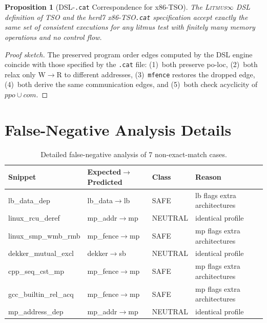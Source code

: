 \documentclass[11pt]{article}
\newcommand{\litmus}{\textsc{Litmus$\infty$}}
\newtheorem{proposition}[theorem]{Proposition}
\begin{document}
\begin{proposition}[DSL-\texttt{.cat} Correspondence for x86-TSO]
\label{prop:dsl-cat}
The \litmus{} DSL definition of TSO and the herd7 x86-TSO\texttt{.cat}
specification accept exactly the same set of consistent executions for
any litmus test with finitely many memory operations and no control flow.
\end{proposition}

\begin{proof}[Proof sketch]
The preserved program order edges computed by the DSL engine coincide
with those specified by the \texttt{.cat} file: (1)~both preserve po-loc,
(2)~both relax only W$\to$R to different addresses,
(3)~\texttt{mfence} restores the dropped edge,
(4)~both derive the same communication edges, and
(5)~both check acyclicity of $\mathit{ppo} \cup \mathit{com}$.
\end{proof}

\section{False-Negative Analysis Details}
\label{app:false-neg-details}

\begin{longtable}{lllp{5cm}}
\caption{Detailed false-negative analysis of 7 non-exact-match cases.} \\
\toprule
\textbf{Snippet} & \textbf{Expected$\to$Predicted} & \textbf{Class} & \textbf{Reason} \\
\midrule
\endfirsthead
\endhead
\bottomrule
\endfoot
lb\_data\_dep & lb\_data$\to$lb & SAFE & lb flags extra architectures \\
linux\_rcu\_deref & mp\_addr$\to$mp & NEUTRAL & identical profile \\
linux\_smp\_wmb\_rmb & mp\_fence$\to$mp & SAFE & mp flags extra architectures \\
dekker\_mutual\_excl & dekker$\to$sb & NEUTRAL & identical profile \\
cpp\_seq\_cst\_mp & mp\_fence$\to$mp & SAFE & mp flags extra architectures \\
gcc\_builtin\_rel\_acq & mp\_fence$\to$mp & SAFE & mp flags extra architectures \\
mp\_address\_dep & mp\_addr$\to$mp & NEUTRAL & identical profile \\
\end{longtable}

\end{document}
